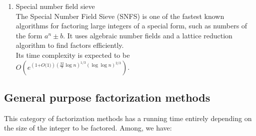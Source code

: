 \documentclass[sigconf,balance=false]{acmart}
\begin{document}
\begin{enumerate}
\item Special number field sieve \\
The Special Number Field Sieve (SNFS) is one of the fastest known algorithms for factoring large integers of a special form, such as numbers of the form $a^n \pm b$. It uses algebraic number fields and a lattice reduction algorithm to find factors efficiently.\\
Its time complexity is expected to be\\ $O\left(e^{\left(1\text{+}O\text{(}1\text{)}\right)\left(\frac{32}{9}\log n\right)^{1\text{/}3}\left(\log\log n\right)^{2\text{/}3}}\right)$. \ \\

\end{enumerate}
\subsection{General purpose factorization methods}
This category of factorization methods has a running time entirely depending on the size of the integer to be factored.
Among, we have:
\end{document}
